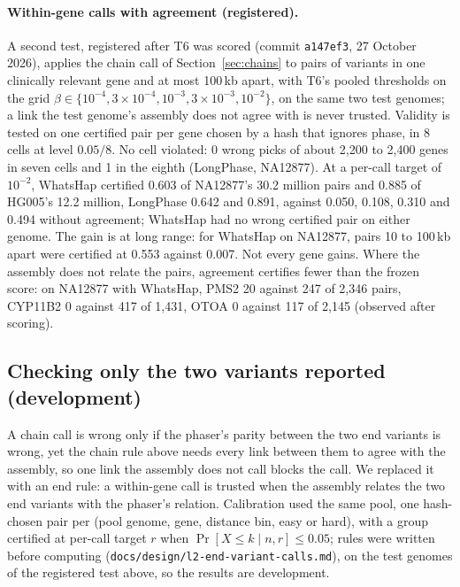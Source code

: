 \documentclass[11pt]{article}
\theoremstyle{definition}
\theoremstyle{remark}
\begin{document}
\paragraph{Within-gene calls with agreement (registered).} A second test,
registered after T6 was scored (commit \texttt{a147ef3}, 27 October 2026),
applies the chain call of Section~\ref{sec:chains} to pairs of variants in
one clinically relevant gene and at most 100\,kb apart, with T6's pooled
thresholds on the grid $\beta\in\{10^{-4},3\times10^{-4},10^{-3},3\times
10^{-3},10^{-2}\}$, on the same two test genomes; a link the test genome's
assembly does not agree with is never trusted. Validity is tested on one
certified pair per gene chosen by a hash that ignores phase, in 8 cells at
level $0.05/8$. No cell violated: 0 wrong picks of about 2{,}200 to 2{,}400
genes in seven cells and 1 in the eighth (LongPhase, NA12877). At a per-call
target of $10^{-2}$, WhatsHap certified 0.603 of NA12877's 30.2 million pairs
and 0.885 of HG005's 12.2 million, LongPhase 0.642 and 0.891, against 0.050,
0.108, 0.310 and 0.494 without agreement; WhatsHap had no wrong certified
pair on either genome. The gain is at long range: for WhatsHap on NA12877,
pairs 10 to 100\,kb apart were certified at 0.553 against 0.007. Not every
gene gains. Where the assembly does not relate the pairs, agreement
certifies fewer than the frozen score: on NA12877 with WhatsHap, PMS2 20
against 247 of 2{,}346 pairs, CYP11B2 0 against 417 of 1{,}431, OTOA 0
against 117 of 2{,}145 (observed after scoring).

\subsection{Checking only the two variants reported (development)}\label{sec:endcalls}

A chain call is wrong only if the phaser's parity between the two end
variants is wrong, yet the chain rule above needs every link between them
to agree with the assembly, so one link the assembly does not call blocks
the call. We replaced it with an end rule: a within-gene call is trusted
when the assembly relates the two end variants with the phaser's relation.
Calibration used the same pool, one hash-chosen pair per (pool genome,
gene, distance bin, easy or hard), with a group certified at per-call
target $r$ when $\Pr[X\le k\mid n,r]\le0.05$; rules were written before
computing (\nolinkurl{docs/design/l2-end-variant-calls.md}), on the test
genomes of the registered test above, so the results are development.
\end{document}
